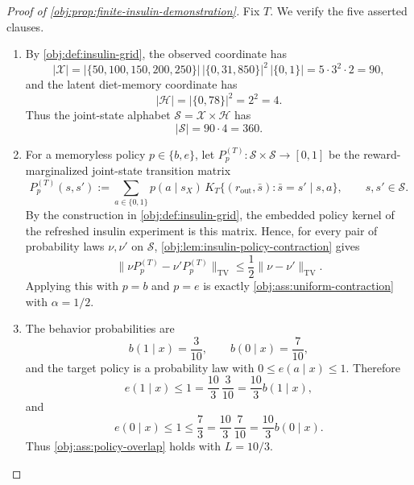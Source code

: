 \begin{proof}[Proof of \cref{obj:prop:finite-insulin-demonstration}]
Fix \(T\). We verify the five asserted clauses.

\begin{enumerate}
\item By \cref{obj:def:insulin-grid}, the observed coordinate has
\[
|\mathcal X|
=
|\{50,100,150,200,250\}|\,
|\{0,31,850\}|^2\,|\{0,1\}|
=
5\cdot 3^2\cdot 2
=
90,
\]
and the latent diet-memory coordinate has
\[
|\mathcal H|=|\{0,78\}|^2=2^2=4.
\]
Thus the joint-state alphabet \(\mathcal S=\mathcal X\times\mathcal H\) has
\[
|\mathcal S|=90\cdot4=360.
\]

\item For a memoryless policy \(p\in\{b,e\}\), let \(P_p^{(T)}:\mathcal S\times\mathcal S\to[0,1]\) be the reward-marginalized joint-state transition matrix
\[
P_p^{(T)}(s,s')
:=
\sum_{a\in\{0,1\}}p(a\mid s_X)\,
K_T\{(r_{\mathrm{out}},\bar s):\bar s=s'\mid s,a\},
\qquad s,s'\in\mathcal S .
\]
By the construction in \cref{obj:def:insulin-grid}, the embedded policy kernel of the refreshed insulin experiment is this matrix. Hence, for every pair of probability laws \(\nu,\nu'\) on \(\mathcal S\), \cref{obj:lem:insulin-policy-contraction} gives
\[
\|\nu P_p^{(T)}-\nu'P_p^{(T)}\|_{\mathrm{TV}}
\le
\frac12\|\nu-\nu'\|_{\mathrm{TV}} .
\]
Applying this with \(p=b\) and \(p=e\) is exactly \cref{obj:ass:uniform-contraction} with \(\alpha=1/2\). %

\item The behavior probabilities are
\[
b(1\mid x)=\frac3{10},
\qquad
b(0\mid x)=\frac7{10},
\]
and the target policy is a probability law with \(0\le e(a\mid x)\le1\). Therefore
\[
e(1\mid x)\le 1=\frac{10}{3}\,\frac3{10}
=\frac{10}{3}b(1\mid x),
\]
and
\[
e(0\mid x)\le 1\le \frac73
=\frac{10}{3}\,\frac7{10}
=\frac{10}{3}b(0\mid x).
\]
Thus \cref{obj:ass:policy-overlap} holds with \(L=10/3\). %


\end{enumerate}
\end{proof}
